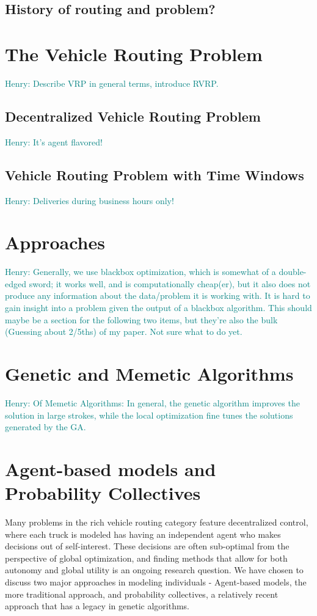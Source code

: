 \documentclass{sig-alternate}
\newcommand{\allcomments}[1]{{#1}}
\newcommand{\hfcomment}[1]{\textcolor{Teal}{\allcomments{Henry: {#1}}}}
\begin{document}
\subsection{History of routing and problem?}
\section{The Vehicle Routing Problem}
\label{sec:VRP}
\hfcomment{Describe VRP in general terms, introduce RVRP.}
\subsection{Decentralized Vehicle Routing Problem}
\hfcomment{It's agent flavored!}
\subsection{Vehicle Routing Problem with Time Windows}
\hfcomment{Deliveries during business hours only!}
	
\section{Approaches}
\hfcomment{Generally, we use blackbox optimization, which is somewhat of a double-edged sword; it works well, and is computationally cheap(er), but it also does not produce any information about the data/problem it is working with. It is hard to gain insight into a problem given the output of a blackbox algorithm. This should maybe be a section for the following two items, but they're also the bulk (Guessing about 2/5ths) of my paper. Not sure what to do yet.}

\section{Genetic and Memetic Algorithms}
\hfcomment{Of Memetic Algorithms: In general, the genetic algorithm improves the solution in large strokes, while the local optimization fine tunes the solutions generated by the GA.}

\section{Agent-based models and Probability Collectives}
\label{sec:not this section.}
Many problems in the rich vehicle routing category feature decentralized control, where each truck is modeled has having an independent agent who makes decisions out of self-interest. These decisions are often sub-optimal from the perspective of global optimization, and finding methods that allow for both autonomy and global utility is an ongoing research question. We have chosen to discuss two major approaches in modeling individuals - Agent-based models, the more traditional approach, and probability collectives, a relatively recent approach that has a legacy in genetic algorithms.
\end{document}
